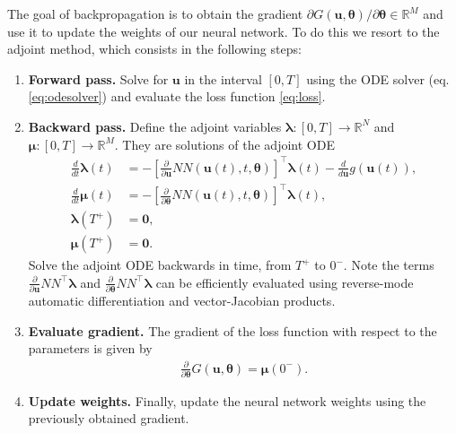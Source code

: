 \documentclass[final,onefignum,onetabnum]{siamart220329}
\newcommand{\bol}{\boldsymbol}
\newcommand{\R}{\mathbb{R}}
\begin{document}
The goal of backpropagation is to obtain the gradient $\partial G(\bol{u},\bol\theta) / \partial\bol\theta \in \R^M$ and use it to update the weights of our neural network. To do this we resort to the adjoint method, which consists in the following steps:\\
\begin{enumerate}
	\item \textbf{Forward pass.} Solve for $\bol u$ in the interval $[0,T]$ using the ODE solver (eq. \ref{eq:odesolver}) and evaluate the loss function \eqref{eq:loss}.
	
	\item \textbf{Backward pass.} Define the adjoint variables $\bol\lambda:[0,T] \rightarrow \R^N$ and $\bol\mu:[0,T] \rightarrow \R^M$. They are solutions of the adjoint ODE
	\begin{subequations}
	\begin{align}
		\frac{d}{dt} \bol{\lambda}(t) &= -\left[\frac{\partial }{\partial\bol{u}}\textit{NN}(\bol{u}(t),t,\bol \theta)\right]^\top \bol{\lambda}(t)- \frac{d}{d\bol{u}} g(\bol u (t)),\\
		\frac{d}{dt} \bol{\mu}(t) &= -\left[\frac{\partial }{\partial\bol\theta}\textit{NN}(\bol{u}(t),t,\bol \theta)\right]^\top  \bol{\lambda}(t),\\
		\bol\lambda(T^+) &= \bol 0,\\
		\bol\mu(T^+) &= \bol 0.
	\end{align}\label{eq:adjointode}
	\end{subequations}
	Solve the adjoint ODE backwards in time, from $T^+$ to $0^-$. Note the terms $\tfrac{\partial }{\partial\bol{u}}\textit{NN}^\top \bol{\lambda}$ and $\tfrac{\partial}{\partial\bol{\theta}}\textit{NN}^\top \bol{\lambda}$ can be efficiently evaluated using reverse-mode automatic differentiation and vector-Jacobian products.
	
	\item \textbf{Evaluate gradient.} The gradient of the loss function with respect to the parameters is given by
	\begin{align}
		\frac{\partial}{\partial\bol\theta} G(\bol{u},\bol\theta) = \bol\mu(0^-).
	\end{align}
	
	\item \textbf{Update weights.} Finally, update the neural network weights using the previously obtained gradient.\\
\end{enumerate}
\end{document}

